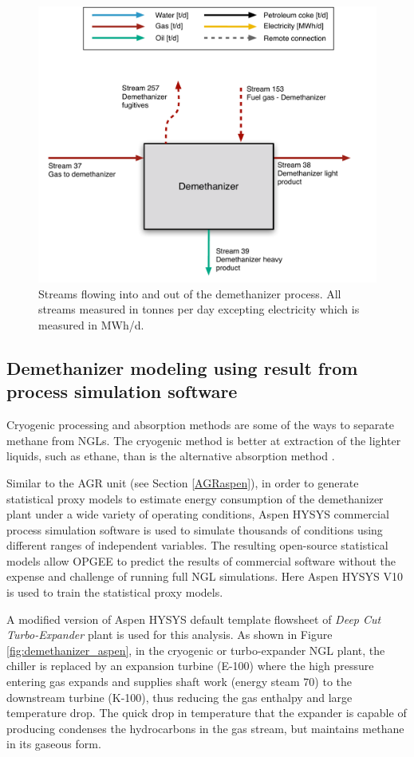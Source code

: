 \documentclass[11pt]{report}
\begin{document}
\begin{figure}
\includegraphics[width=0.85\columnwidth]{images/Demethanizer_PF.pdf}
\caption{Streams flowing into and out of the demethanizer process. All streams measured in tonnes per day excepting electricity which is measured in MWh/d.}
\label{fig:demethanizer_PF}
\end{figure}

\subsection{Demethanizer modeling using result from process simulation software} \label{Demethanizer_aspen}

Cryogenic processing and absorption methods are some of the ways to separate methane from NGLs. The cryogenic method is better at extraction of the lighter liquids, such as ethane, than is the alternative absorption method \cite{roy2011aspen}. 

Similar to the AGR unit (see Section \ref{AGRaspen}), in order to generate statistical proxy models to estimate energy consumption of the demethanizer plant under a wide variety of operating conditions, Aspen HYSYS commercial process simulation software is used to simulate thousands of conditions using different ranges of independent variables. The resulting open-source statistical models allow OPGEE to predict the results of commercial software without the expense and challenge of running full NGL simulations. Here Aspen HYSYS V10 is used to train the statistical proxy models. 

A modified version of Aspen HYSYS default template flowsheet of \emph{Deep Cut Turbo-Expander} plant is used for this analysis. As shown in Figure \ref{fig:demethanizer_aspen}, in the cryogenic or turbo-expander NGL plant, the chiller is replaced by an expansion turbine (E-100) where the high pressure entering gas expands and supplies shaft work (energy steam 70) to the downstream turbine (K-100), thus reducing the gas enthalpy and large temperature drop. The quick drop in temperature that the expander is capable of producing condenses the hydrocarbons in the gas stream, but maintains methane in its gaseous form. 
\end{document}
